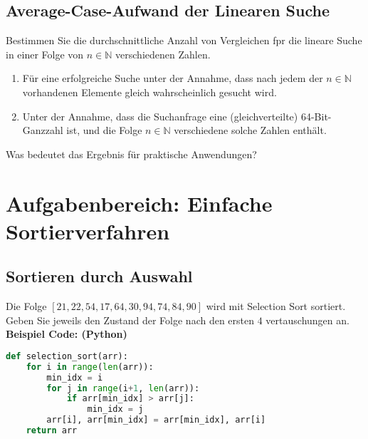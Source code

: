 \documentclass{article}
\begin{document}
\subsection{Average-Case-Aufwand der Linearen Suche}
Bestimmen Sie die durchschnittliche Anzahl von Vergleichen fpr die lineare Suche in einer Folge von $n \in \mathbb{N}$ verschiedenen Zahlen.
\begin{enumerate}[label=\alph*)]
    \item Für eine erfolgreiche Suche unter der Annahme, dass nach jedem der $n \in \mathbb{N}$ vorhandenen Elemente gleich wahrscheinlich gesucht wird.
    \item Unter der Annahme, dass die Suchanfrage eine (gleichverteilte) 64-Bit-Ganzzahl ist, und die Folge $n \in \mathbb{N}$ verschiedene solche Zahlen enthält.
\end{enumerate}
Was bedeutet das Ergebnis für praktische Anwendungen?
\section{Aufgabenbereich: Einfache Sortierverfahren}
\subsection{Sortieren durch Auswahl}
Die Folge $[21,22,54,17,64,30,94,74,84,90]$ wird mit Selection Sort sortiert. Geben Sie jeweils den Zustand der Folge nach den ersten $4$ vertauschungen an.\vspace{2cm}\\
\textbf{Beispiel Code: (Python)} %
\begin{lstlisting}[language=python]
def selection_sort(arr):
    for i in range(len(arr)):
        min_idx = i
        for j in range(i+1, len(arr)):
            if arr[min_idx] > arr[j]:
                min_idx = j
        arr[i], arr[min_idx] = arr[min_idx], arr[i]
    return arr
\end{lstlisting}
\newpage
\end{document}
